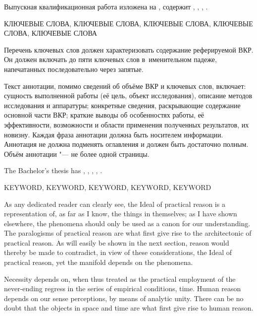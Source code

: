 

Выпускная квалификационная работа изложена на  
,
содержит
,
,
, 
.
\bigskip

\noindent
КЛЮЧЕВЫЕ СЛОВА, КЛЮЧЕВЫЕ СЛОВА, КЛЮЧЕВЫЕ СЛОВА, КЛЮЧЕВЫЕ СЛОВА, 
КЛЮЧЕВЫЕ СЛОВА
\bigskip

Перечень ключевых слов должен характеризовать содержание реферируемой 
ВКР. Он должен включать до пяти ключевых слов в~именительном падеже, 
напечатанных последовательно через запятые. 

Текст аннотации, помимо сведений об объёме ВКР и ключевых слов, 
включает: сущность выполненной работы (её цель, объект исследования), 
описание методов исследования и аппаратуры; конкретные сведения, 
раскрывающие содержание основной части ВКР; краткие выводы 
об особенностях работы, её эффективности, возможности и области 
применения полученных результатов, их новизну. Каждая фраза аннотации 
должна быть носителем информации. Аннотация не должна подменять 
оглавления и должен быть достаточно полным. Объём аннотации "--- 
не более одной страницы.


\clearpage
{}


The Bachelor's thesis has
,
,
,
, 
.
\bigskip

\noindent
KEYWORD, KEYWORD, KEYWORD, KEYWORD, KEYWORD
\bigskip

As any dedicated reader can clearly see, the Ideal of
practical reason is a representation of, as far as I know, the things
in themselves; as I have shown elsewhere, the phenomena should only be
used as a canon for our understanding. The paralogisms of practical
reason are what first give rise to the architectonic of practical
reason. As will easily be shown in the next section, reason would
thereby be made to contradict, in view of these considerations, the
Ideal of practical reason, yet the manifold depends on the phenomena.

Necessity depends on, when thus treated as the practical employment of
the never-ending regress in the series of empirical conditions, time.
Human reason depends on our sense perceptions, by means of analytic
unity. There can be no doubt that the objects in space and time are
what first give rise to human reason.

